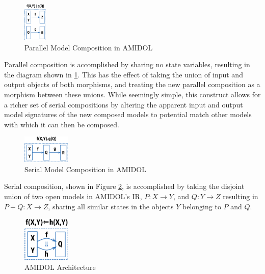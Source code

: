 \documentclass[12pt]{galois-whitepaper}
\begin{document}
\begin{figure}
  \centering
  \includegraphics[width=0.1\textwidth]{figs/parallel.png}
  \caption{Parallel Model Composition in AMIDOL}
  \label{Fig:Parallel}
\end{figure}

Parallel composition is accomplished by sharing no state variables,
resulting in the diagram shown in \ref{Fig:Parallel}.  This has the
effect of taking the union of input and output objects of both
morphisms, and treating the new parallel composition as a morphism
between these unions.  While seemingly simple, this construct allows
for a richer set of serial compositions by altering the apparent input
and output model signatures of the new composed models to potential
match other models with which it can then be composed.

\begin{figure}
  \centering
  \includegraphics[width=0.2\textwidth]{figs/serial.png}
  \caption{Serial Model Composition in AMIDOL}
  \label{Fig:Serial}
\end{figure}

Serial composition, shown in Figure \ref{Fig:Serial}, is accomplished by taking the disjoint
union of two open models in AMIDOL's IR, $P: X \rightarrow Y$, and
$Q: Y \rightarrow Z$ resulting in $P+Q: X \rightarrow Z$, sharing all
similar states in the objects $Y$ belonging to $P$ and $Q$.

\begin{figure}
  \centering
  \includegraphics[width=0.2\textwidth]{figs/substitution.png}
  \caption{AMIDOL Architecture}
  \label{Fig:Sub}
\end{figure}
\end{document}
